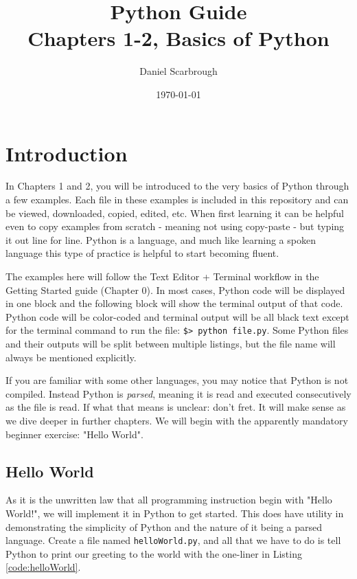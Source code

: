 \documentclass[oneside]{book}
\title{Python Guide\\Chapters 1-2, Basics of Python}
\author{Daniel Scarbrough}
\date{\today}
\begin{document}
\maketitle

\tableofcontents

\chapter{Introduction}

In Chapters 1 and 2, you will be introduced to the very basics of Python through a few examples. Each file in these examples is included in this repository and can be viewed, downloaded, copied, edited, etc. When first learning it can be helpful even to copy examples from scratch - meaning not using copy-paste - but typing it out line for line. Python is a language, and much like learning a spoken language this type of practice is helpful to start becoming fluent.

The examples here will follow the Text Editor + Terminal workflow in the Getting Started guide (Chapter 0). In most cases, Python code will be displayed in one block and the following block will show the terminal output of that code. Python code will be color-coded and terminal output will be all black text except for the terminal command to run the file: {\color{OliveGreen}\texttt{\$> python file.py}}. Some Python files and their outputs will be split between multiple listings, but the file name will always be mentioned explicitly.

If you are familiar with some other languages, you may notice that Python is not compiled. Instead Python is \textit{parsed}, meaning it is read and executed consecutively as the file is read. If what that means is unclear: don't fret. It will make sense as we dive deeper in further chapters. We will begin with the apparently mandatory beginner exercise: "Hello World".

\section{Hello World}
\label{sec:helloWorld}
As it is the unwritten law that all programming instruction begin with "Hello World!", we will implement it in Python to get started. This does have utility in demonstrating the simplicity of Python and the nature of it being a parsed language. Create a file named \texttt{helloWorld.py}, and all that we have to do is tell Python to print our greeting to the world with the one-liner in Listing \ref{code:helloWorld}.
\end{document}
